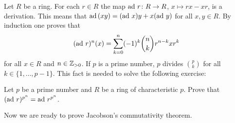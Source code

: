 Let $R$ be a ring. For each $r\in R$ the map $\operatorname{ad}\,r\colon
R\to R$, $x\mapsto rx-xr$, is a derivation. This means that
$\operatorname{ad}\,(xy)=(\operatorname{ad}\,x)y+x(\operatorname{ad}\,y)$ for all $x,y\in R$. 
By induction one proves that 
\begin{equation}
	\label{eq:Leibniz}
	(\operatorname{ad}\,r)^n(x)=\sum_{k=0}^n(-1)^k\binom{n}{k}r^{n-k}xr^k
\end{equation}
for all $x\in R$ and $n\in\mathbb{Z}_{>0}$. If $p$ 
is a prime number, 
$p$ divides $\binom{p}{k}$ for all $k\in\{1,\dots,p-1\}$. This fact
is needed to solve the following exercise:

\begin{exercise}
    Let $p$ be a prime number and $R$ be a ring of characteristic $p$. 
    Prove that $(\operatorname{ad}\,r)^{p^n}=\operatorname{ad}\,r^{p^n}$. 
\end{exercise}



Now we are ready to prove Jacobson's commutativity theorem. 

